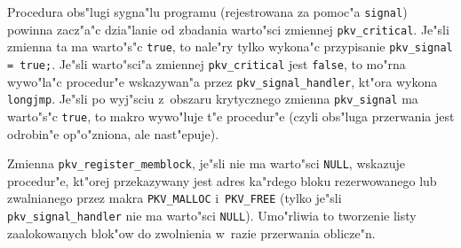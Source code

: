 Procedura obs"lugi sygna"lu programu (rejestrowana za pomoc"a \texttt{signal})
powinna zacz"a"c dzia"lanie od zbadania warto"sci zmiennej \texttt{pkv\_critical}.
Je"sli zmienna ta ma warto"s"c \texttt{true}, to nale"ry tylko wykona"c przypisanie
\texttt{pkv\_signal = true;}. Je"sli warto"sci"a zmiennej \texttt{pkv\_critical}
jest \texttt{false}, to mo"rna wywo"la"c procedur"e wskazywan"a przez
\texttt{pkv\_signal\_handler}, kt"ora wykona \texttt{longjmp}.
Je"sli po wyj"sciu z~obszaru krytycznego zmienna \texttt{pkv\_signal}
ma warto"s"c \texttt{true}, to makro wywo"luje t"e procedur"e
(czyli obs"luga przerwania jest odrobin"e op"o"zniona, ale nast"epuje).

Zmienna \texttt{pkv\_register\_memblock}, je"sli nie ma warto"sci \texttt{NULL},
wskazuje procedur"e, kt"orej przekazywany jest adres ka"rdego bloku
rezerwowanego lub zwalnianego przez makra \texttt{PKV\_MALLOC}
i~\texttt{PKV\_FREE} (tylko je"sli \texttt{pkv\_signal\_handler} nie ma warto"sci
\texttt{NULL}). Umo"rliwia to tworzenie listy zaalokowanych blok"ow
do zwolnienia w~razie przerwania oblicze"n.

